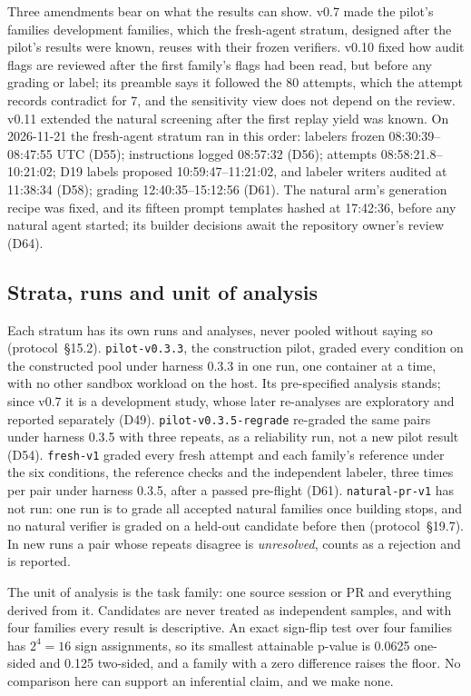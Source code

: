 Three amendments bear on what the results can show. v0.7 made the pilot's families development families, which the fresh-agent stratum, designed after the pilot's results were known, reuses with their frozen verifiers. v0.10 fixed how audit flags are reviewed after the first family's flags had been read, but before any grading or label; its preamble says it followed the 80 attempts, which the attempt records contradict for 7, and the sensitivity view does not depend on the review. v0.11 extended the natural screening after the first replay yield was known. On 2026-11-21 the fresh-agent stratum ran in this order: labelers frozen 08:30:39--08:47:55 UTC (D55); instructions logged 08:57:32 (D56); attempts 08:58:21.8--10:21:02; D19 labels proposed 10:59:47--11:21:02, and labeler writers audited at 11:38:34 (D58); grading 12:40:35--15:12:56 (D61). The natural arm's generation recipe was fixed, and its fifteen prompt templates hashed at 17:42:36, before any natural agent started; its builder decisions await the repository owner's review (D64).

\subsection{Strata, runs and unit of analysis}
\label{sec:runs}
Each stratum has its own runs and analyses, never pooled without saying so (protocol~\S15.2). \texttt{pilot-v0.3.3}, the construction pilot, graded every condition on the constructed pool under harness 0.3.3 in one run, one container at a time, with no other sandbox workload on the host. Its pre-specified analysis stands; since v0.7 it is a development study, whose later re-analyses are exploratory and reported separately (D49). \texttt{pilot-v0.3.5-regrade} re-graded the same pairs under harness 0.3.5 with three repeats, as a reliability run, not a new pilot result (D54). \texttt{fresh-v1} graded every fresh attempt and each family's reference under the six conditions, the reference checks and the independent labeler, three times per pair under harness 0.3.5, after a passed pre-flight (D61). \texttt{natural-pr-v1} has not run: one run is to grade all accepted natural families once building stops, and no natural verifier is graded on a held-out candidate before then (protocol~\S19.7). In new runs a pair whose repeats disagree is \emph{unresolved}, counts as a rejection and is reported.

The unit of analysis is the task family: one source session or PR and everything derived from it. Candidates are never treated as independent samples, and with four families every result is descriptive. An exact sign-flip test over four families has $2^4=16$ sign assignments, so its smallest attainable p-value is 0.0625 one-sided and 0.125 two-sided, and a family with a zero difference raises the floor. No comparison here can support an inferential claim, and we make none.

